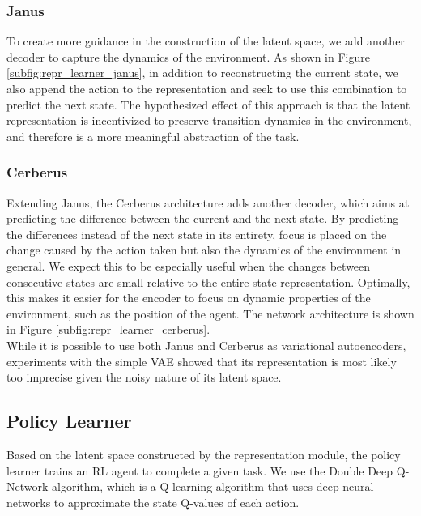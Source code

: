 \subsubsection{Janus}
To create more guidance in the construction of the latent space, we add another decoder to capture the dynamics of the environment. As shown in Figure \ref{subfig:repr_learner_janus}, in addition to reconstructing the current state, we also append the action to the representation and seek to use this combination to predict the next state.
The hypothesized effect of this approach is that the latent representation is incentivized to preserve transition dynamics in the environment, and therefore is a more meaningful abstraction of the task.

\subsubsection{Cerberus}
Extending Janus, the Cerberus architecture adds another decoder, which aims at predicting the difference between the current and the next state. By predicting the differences instead of the next state in its entirety, focus is placed on the change caused by the action taken but also the dynamics of the environment in general. We expect this to be especially useful when the changes between consecutive states are small relative to the entire state representation. Optimally, this makes it easier for the encoder to focus on dynamic properties of the environment, such as the position of the agent. The network architecture is shown in Figure \ref{subfig:repr_learner_cerberus}.\\

While it is possible to use both Janus and Cerberus as variational autoencoders, experiments with the simple VAE showed that its representation is most likely too imprecise given the noisy nature of its latent space.

\subsection{Policy Learner}
Based on the latent space constructed by the representation module, the policy learner trains an RL agent to complete a given task. 
We use the Double Deep Q-Network \citep{DDQN} algorithm, which is a Q-learning algorithm that uses deep neural networks to approximate the state Q-values of each action.

